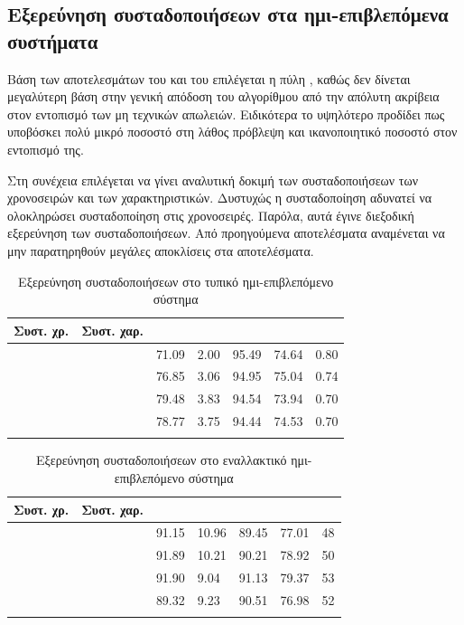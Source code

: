 \subsection{Εξερεύνηση συσταδοποιήσεων στα ημι-επιβλεπόμενα συστήματα}
Βάση των αποτελεσμάτων του  και του  επιλέγεται η πύλη , καθώς δεν δίνεται μεγαλύτερη βάση στην γενική απόδοση του αλγορίθμου από την απόλυτη ακρίβεια στον εντοπισμό των μη τεχνικών απωλειών. Ειδικότερα το υψηλότερο  προδίδει πως υποβόσκει πολύ μικρό ποσοστό στη λάθος πρόβλεψη και ικανοποιητικό ποσοστό στον εντοπισμό της.\par
Στη συνέχεια επιλέγεται να γίνει αναλυτική δοκιμή των συσταδοποιήσεων των χρονοσειρών και των χαρακτηριστικών. Δυστυχώς η συσταδοποίηση  αδυνατεί να ολοκληρώσει συσταδοποίηση στις χρονοσειρές. Παρόλα, αυτά έγινε διεξοδική εξερεύνηση των συσταδοποιήσεων. Από προηγούμενα αποτελέσματα αναμένεται να μην παρατηρηθούν μεγάλες αποκλίσεις στα αποτελέσματα.
\begin{center}
    \begin{longtabu} to 0.8\textwidth { |X[c]| X[c] || X[c] | X[c] | X[c] | X[c] | X[c] |  }
 \hline
 Συστ. χρ.&Συστ. χαρ.&   &  &  &  & \\
\hline
{}& & 71.09 & 2.00 & 95.49 & 74.64 & 0.80\\
 \hline
 && 76.85 & 3.06 & 94.95 & 75.04 & 0.74\\ 
\hline
{}& &79.48& 3.83 & 94.54 & 73.94 & 0.70\\ 
 \hline
 & & 78.77 & 3.75 & 94.44 & 74.53 & 0.70\\
\hline
\caption{Εξερεύνηση συσταδοποιήσεων στο τυπικό ημι-επιβλεπόμενο σύστημα}
\label{tab:testclustersemisup1}
\end{longtabu}
\end{center}

\begin{center}
\begin{longtabu} to 0.8\textwidth { | X[c] | X[c] || X[c] | X[c] | X[c] | X[c] | X[c] |  }
 \hline
 Συστ. χρ.& Συστ. χαρ.&   &  &  &  & \\
\hline
{} && 91.15 & 10.96  & 89.45 & 77.01 & 48\\
 \hline
 &&  91.89 & 10.21  & 90.21 & 78.92 & 50\\ 
\hline
{}& &91.90 & 9.04  & 91.13 & 79.37 & 53\\ 
 \hline
 & & 89.32 & 9.23  & 90.51 & 76.98 & 52\\
\hline
\caption{Εξερεύνηση συσταδοποιήσεων στο εναλλακτικό ημι-επιβλεπόμενο σύστημα}
\label{tab:testclustersemisup2}
\end{longtabu}
\end{center}
